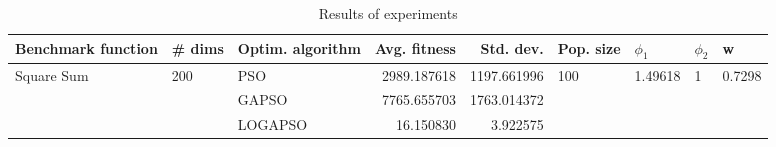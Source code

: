 \begin{table}
\centering
\caption{Results of experiments}
\begin{tabular}{lllrrllll}
\toprule
         Benchmark function &              \# dims & Optim. algorithm &  Avg. fitness &   Std. dev. &            Pop. size &               $\phi_{1}$ &         $\phi_{2}$ &                       w \\
\midrule
\multirow{3}{*}{Square Sum} & \multirow{3}{*}{200} &              PSO &   2989.187618 & 1197.661996 & \multirow{3}{*}{100} & \multirow{3}{*}{1.49618} & \multirow{3}{*}{1} & \multirow{3}{*}{0.7298} \\
                            &                      &            GAPSO &   7765.655703 & 1763.014372 &                      &                          &                    &                         \\
                            &                      &          LOGAPSO &     16.150830 &    3.922575 &                      &                          &                    &                         \\
\bottomrule
\end{tabular}
\end{table}
